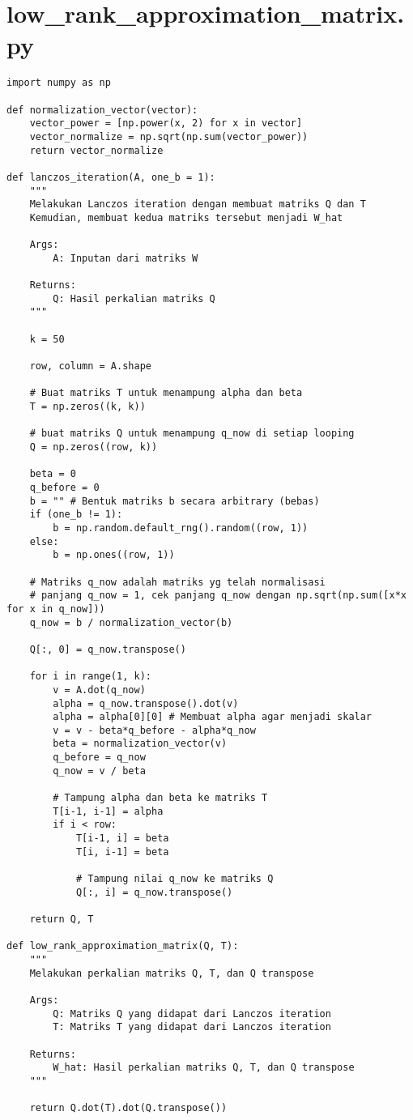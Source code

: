 \chapter{low\_rank\_approximation\_matrix.py}
\begin{lstlisting}[breaklines=true]
import numpy as np

def normalization_vector(vector):
	vector_power = [np.power(x, 2) for x in vector]
	vector_normalize = np.sqrt(np.sum(vector_power))
	return vector_normalize

def lanczos_iteration(A, one_b = 1):
	"""
	Melakukan Lanczos iteration dengan membuat matriks Q dan T
	Kemudian, membuat kedua matriks tersebut menjadi W_hat

	Args:
		A: Inputan dari matriks W
		
	Returns:
		Q: Hasil perkalian matriks Q 
	"""
	
	k = 50
	
	row, column = A.shape
	
	# Buat matriks T untuk menampung alpha dan beta
	T = np.zeros((k, k))
	
	# buat matriks Q untuk menampung q_now di setiap looping
	Q = np.zeros((row, k))
	
	beta = 0 
	q_before = 0
	b = "" # Bentuk matriks b secara arbitrary (bebas)
	if (one_b != 1):
		b = np.random.default_rng().random((row, 1))
	else:
		b = np.ones((row, 1)) 
		
	# Matriks q_now adalah matriks yg telah normalisasi
	# panjang q_now = 1, cek panjang q_now dengan np.sqrt(np.sum([x*x for x in q_now]))
	q_now = b / normalization_vector(b)
	
	Q[:, 0] = q_now.transpose()
	
	for i in range(1, k):
		v = A.dot(q_now)
		alpha = q_now.transpose().dot(v)
		alpha = alpha[0][0] # Membuat alpha agar menjadi skalar
		v = v - beta*q_before - alpha*q_now
		beta = normalization_vector(v)
		q_before = q_now
		q_now = v / beta
		
		# Tampung alpha dan beta ke matriks T
		T[i-1, i-1] = alpha
		if i < row:
			T[i-1, i] = beta
			T[i, i-1] = beta
			
			# Tampung nilai q_now ke matriks Q
			Q[:, i] = q_now.transpose()

	return Q, T

def low_rank_approximation_matrix(Q, T):
	"""
	Melakukan perkalian matriks Q, T, dan Q transpose

	Args:
		Q: Matriks Q yang didapat dari Lanczos iteration
		T: Matriks T yang didapat dari Lanczos iteration
		
	Returns:
		W_hat: Hasil perkalian matriks Q, T, dan Q transpose
	"""
	
	return Q.dot(T).dot(Q.transpose())
\end{lstlisting}

